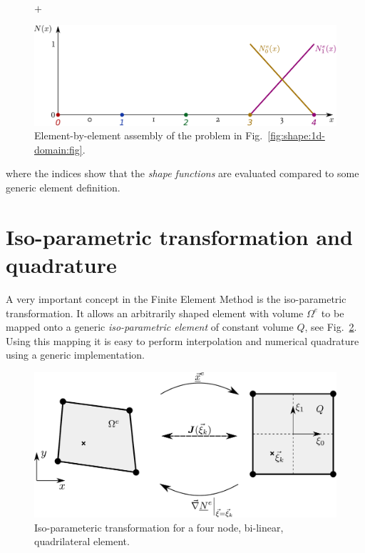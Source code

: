 \documentclass[times,namecite]{goose-article}
\begin{document}
\begin{figure}[htp]
  \\
  $+$
  \\
  \begin{minipage}[t]{.5\textwidth}
    \centering
    \includegraphics[width=1.\textwidth]{figures/shape-functions-1d-element-3.pdf}
  \end{minipage}
  \caption{Element-by-element assembly of the problem in Fig.~\ref{fig:shape:1d-domain:fig}.}
  \label{fig:shape:1d-domain:assembly}
\end{figure}


where the indices show that the \emph{shape functions} are evaluated compared to some generic element definition.

\section{Iso-parametric transformation and quadrature}

A very important concept in the Finite Element Method is the iso-parametric transformation. It allows an arbitrarily shaped element with volume $\Omega^e$ to be mapped onto a generic \emph{iso-parametric element} of constant volume $Q$, see Fig.~\ref{fig:isoparametric}. Using this mapping it is easy to perform interpolation and numerical quadrature using a generic implementation.

\begin{figure}[htp]
  \centering
  \includegraphics[width=.5\textwidth]{figures/isoparametric-transform.pdf}
  \caption{Iso-parameteric transformation for a four node, bi-linear, quadrilateral element.}
  \label{fig:isoparametric}
\end{figure}
\end{document}
